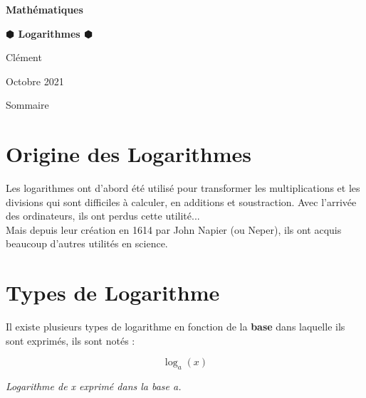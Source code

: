 \documentclass[a4paper]{article}
\begin{document}
	\begin{titlepage}
		\begin{center}
		
\Huge  		\textbf{Mathématiques}\\
		\bigskip \smallskip
		
\Large		\textbf{$\varhexagonblack$ Logarithmes $\varhexagonblack$}\\
		\bigskip
		
\large		Clément   \\ 
		\smallskip 
		
\normalfont	Octobre 2021\\
		\bigskip \bigskip \bigskip
		
		\end{center}
Sommaire\\

	\end{titlepage}

\section*{Origine des Logarithmes}

	Les logarithmes ont d'abord été utilisé pour transformer les multiplications et les divisions qui sont difficiles à calculer, en additions et soustraction. Avec l'arrivée des ordinateurs, ils ont perdus cette utilité...\\
	
	Mais depuis leur création en 1614 par John Napier (ou Neper), ils ont acquis beaucoup d'autres utilités en science.\\
	

\pagebreak

\section*{Types de Logarithme}

	Il existe plusieurs types de logarithme en fonction de la \textbf{base} dans laquelle ils sont exprimés, ils sont notés :
	
	{\huge $$ \log_{a}(x) $$}
	\begin{center}
	\textit{Logarithme de x exprimé dans la base a.}\\
	\end{center}
	
\bigskip	
	
\end{document}
